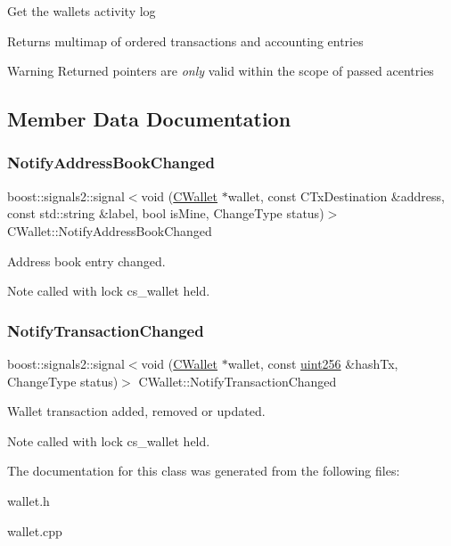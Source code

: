 Get the wallet\textquotesingle{}s activity log \begin{DoxyReturn}{Returns}
multimap of ordered transactions and accounting entries 
\end{DoxyReturn}
\begin{DoxyWarning}{Warning}
Returned pointers are {\itshape only} valid within the scope of passed acentries 
\end{DoxyWarning}


\subsection{Member Data Documentation}
\mbox{\label{class_c_wallet_a86f4563888686dd3dbdee406f74f8d3f}} 
\subsubsection{\texorpdfstring{NotifyAddressBookChanged}{NotifyAddressBookChanged}}
{\footnotesize\ttfamily boost\+::signals2\+::signal$<$void (\mbox{\hyperlink{class_c_wallet}{C\+Wallet}} $\ast$wallet, const C\+Tx\+Destination \&address, const std\+::string \&label, bool is\+Mine, Change\+Type status)$>$ C\+Wallet\+::\+Notify\+Address\+Book\+Changed}

Address book entry changed. \begin{DoxyNote}{Note}
called with lock cs\+\_\+wallet held. 
\end{DoxyNote}
\mbox{\label{class_c_wallet_acd26616ef558afbc5bc62d72603957fc}} 
\subsubsection{\texorpdfstring{NotifyTransactionChanged}{NotifyTransactionChanged}}
{\footnotesize\ttfamily boost\+::signals2\+::signal$<$void (\mbox{\hyperlink{class_c_wallet}{C\+Wallet}} $\ast$wallet, const \mbox{\hyperlink{classuint256}{uint256}} \&hash\+Tx, Change\+Type status)$>$ C\+Wallet\+::\+Notify\+Transaction\+Changed}

Wallet transaction added, removed or updated. \begin{DoxyNote}{Note}
called with lock cs\+\_\+wallet held. 
\end{DoxyNote}


The documentation for this class was generated from the following files\+:\begin{DoxyCompactItemize}
\item 
wallet.\+h\item 
wallet.\+cpp\end{DoxyCompactItemize}
